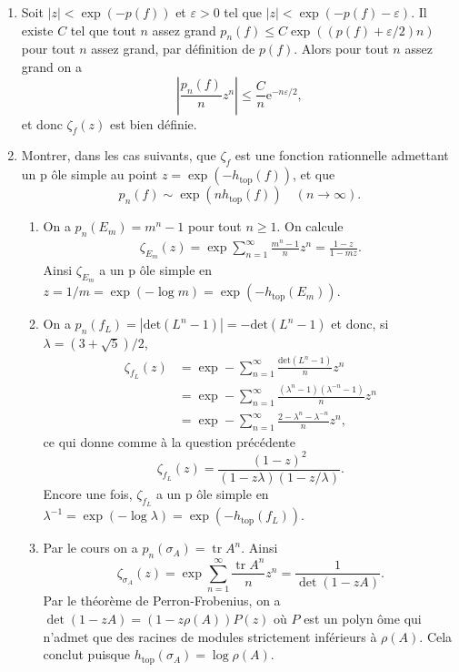 \documentclass[a4paper,12pt,openany]{article}
\theoremstyle{plain}
\theoremstyle{definition}
\newcommand{\e}{\mathrm{e}}
\DeclareMathOperator{\tr}{tr}
\newcommand{\htop}{h_\mathrm{top}}
\begin{document}
\vspace{0.6cm}

 \vspace{1.5mm} 

\noindent

\begin{enumerate}
\item Soit $|z|<\exp(-p(f))$ et $\varepsilon > 0$ tel que $|z|<\exp(-p(f)-\varepsilon)$. Il existe $C$ tel que tout $n$ assez grand $p_n(f) \leq C \exp((p(f) + \varepsilon/2)n)$ pour tout $n$ assez grand, par d\'efinition de $p(f)$. Alors pour tout $n$ assez grand on a
$$
\left|\frac{p_n(f)}{n}z^n\right| \leq \frac{C}{n} \e^{-n\varepsilon/2},
$$
et donc $\zeta_f(z)$ est bien d\'efinie.
\item Montrer, dans les cas suivants, que $\zeta_f$ est une fonction rationnelle admettant un p \^ole simple au point $z = \exp \left(-h_\mathrm{top}(f)\right)$, et que
$$
p_n(f) \sim \exp\left(n\htop(f)\right) \quad (n \to \infty).
$$
\begin{enumerate}
\item On a $p_n(E_m) = m^n-1$ pour tout $n \geq 1$. On calcule
$$
\begin{aligned}
\zeta_{E_m}(z) = \exp \sum_{n=1}^\infty \frac{m^n-1}{n}z^n 
= \frac{1-z}{1-mz}.
\end{aligned}
$$
Ainsi $\zeta_{E_m}$ a un p \^ole simple en $z = 1/m = \exp(-\log m) = \exp(-\htop(E_m))$.

\item On a $p_n(f_L) = |\mathrm{det}(L^n-1)| = -\mathrm{det}(L^n-1)$ et donc, si $\lambda = (3+\sqrt{5})/2$,
$$
\begin{aligned}
\zeta_{f_L}(z) &= \exp -\sum_{n=1}^\infty \frac{\mathrm{det}(L^n-1)}{n} z^n \\
&= \exp -\sum_{n=1}^\infty \frac{(\lambda^n-1)(\lambda^{-n}-1)}{n} z^n \\
&= \exp-\sum_{n=1}^\infty \frac{2 - \lambda^n - \lambda^{-n}}{n}z^n,
\end{aligned}
$$
ce qui donne comme \`a la question pr\'ec\'edente
$$
\zeta_{f_L}(z) = \frac{(1-z)^2}{(1-z\lambda)(1-z/\lambda)}.
$$
Encore une fois, $\zeta_{f_L}$ a un p \^ole simple en $\lambda^{-1} = \exp(-\log \lambda) = \exp(-\htop(f_L))$.

\item Par le cours on a $p_n(\sigma_A) = \tr A^n.$ Ainsi
$$
\zeta_{\sigma_A}(z) = \exp \sum_{n=1}^\infty \frac{\tr A^n}{n}z^n = \frac{1}{\det(1-zA)}.
$$
Par le th\'eor\`eme de Perron-Frobenius, on a $\det(1-zA) = (1-z\rho(A))P(z)$ o\`u $P$ est un polyn \^ome qui n'admet que des racines de modules strictement inf\'erieurs \`a $\rho(A)$. Cela conclut puisque $\htop(\sigma_A) = \log \rho(A)$. 


\end{enumerate}
\end{enumerate}
\end{document}
